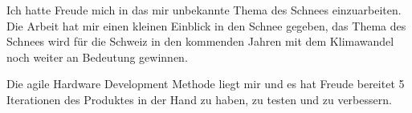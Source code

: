 

Ich hatte Freude mich in das mir unbekannte Thema des Schnees einzuarbeiten. Die Arbeit hat mir einen kleinen Einblick in den Schnee gegeben, das Thema des Schnees wird für die Schweiz in den kommenden Jahren mit dem Klimawandel noch weiter an Bedeutung gewinnen.

Die agile Hardware Development Methode liegt mir und es hat Freude bereitet 5 Iterationen des Produktes in der Hand zu haben, zu testen und zu verbessern.

